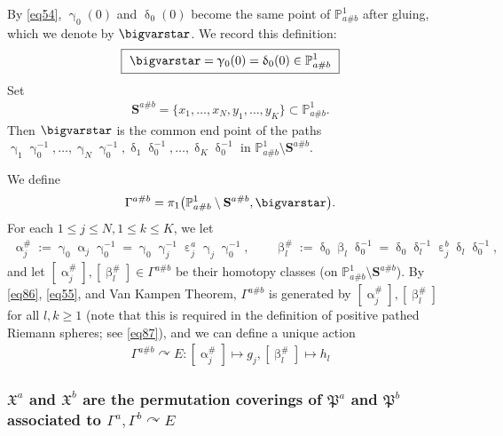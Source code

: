 \documentclass[11pt,b5paper,notitlepage]{article}
\theoremstyle{definition}
\theoremstyle{plain}
\newcommand{\fk}{\mathfrak}
\newcommand{\Pbb}{\mathbb P}
\newcommand{\Sbf}{\mathbf{S}}
\numberwithin{equation}{subsection}
\begin{document}
By \eqref{eq54}, $\upgamma_0(0)$ and $\updelta_0(0)$ become the same point of $\Pbb^1_{a\#b}$ after gluing, which we denote by $\bigvarstar$. We record this definition:
\begin{align*}
\boxed{~\bigvarstar=\upgamma_0(0)=\updelta_0(0)\in\Pbb^1_{a\#b}~}	
\end{align*}
Set
\begin{align*}
\Sbf^{a\#b}=\{x_1,\dots,x_N,y_1,\dots,y_K\}\subset \Pbb^1_{a\#b}.	
\end{align*}
Then $\bigvarstar$ is the common end point of the paths $\upgamma_1\upgamma_0^{-1},\dots,\upgamma_N\upgamma_0^{-1},\updelta_1\updelta_0^{-1},\dots,\updelta_K\updelta_0^{-1}$ in $\Pbb^1_{a\#b}\setminus\Sbf^{a\#b}$.

We define
\begin{align*}
\Gamma^{a\#b}=\pi_1\big(\Pbb^1_{a\#b}\setminus\Sbf^{a\#b},\bigvarstar \big).	
\end{align*}
For each $1\leq j\leq N,1\leq k\leq K$, we let
\begin{gather}
\upalpha_j^\#:=\upgamma_0\upalpha_j\upgamma_0^{-1}=	\upgamma_0\upgamma_j^{-1}\upepsilon_j^a\upgamma_j\upgamma_0^{-1},\qquad\upbeta_l^\#:=\updelta_0\upbeta_l\updelta_0^{-1}=	\updelta_0\updelta_l^{-1}\upepsilon_j^b\updelta_l\updelta_0^{-1},\label{eq60}
\end{gather}
and let $[\upalpha_j^\#],[\upbeta_l^\#]\in\Gamma^{a\#b}$ be their homotopy classes (on $\Pbb^1_{a\#b}\setminus\Sbf^{a\#b}$). By \eqref{eq86}, \eqref{eq55}, and Van Kampen Theorem, $\Gamma^{a\#b}$ is generated by $[\upalpha_j^\#],[\upbeta_l^\#]$ for all $l,k\geq 1$ (note that this is required in the definition of positive pathed Riemann spheres; see \eqref{eq87}), and we can define a unique action 
\begin{align}
\boxed{~\Gamma^{a\#b}\curvearrowright E:[\upalpha_j^\#]\mapsto g_j,	[\upbeta_l^\#]\mapsto h_l~}\label{eq59}
\end{align} 


\subsubsection[$\fk X^a$ and $\fk X^b$ are the permutation coverings of $\fk P^a$ and $\fk P^b$]{$\fk X^a$ and $\fk X^b$ are the permutation coverings of $\fk P^a$ and $\fk P^b$ associated to $\Gamma^a,\Gamma^b\curvearrowright E$}
\end{document}
